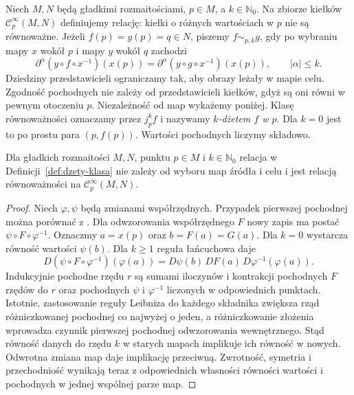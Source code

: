 \begin{definicja}
\label{def:dzety-klasa}
Niech $M,N$ będą gładkimi rozmaitościami, $p\in M$,
a $k\in\mathbb N_0$. Na zbiorze kiełków
$\mathcal C^\infty_p(M,N)$ definiujemy relację:
kiełki o różnych wartościach w $p$ nie są równoważne.
Jeżeli $f(p)=g(p)=q\in N$, piszemy $f\sim_{p,k}g$, gdy
po wybraniu mapy $x$ wokół $p$ i mapy $y$ wokół $q$ zachodzi
\[
 \partial^\alpha (y\circ f\circ x^{-1})(x(p))
 =\partial^\alpha (y\circ g\circ x^{-1})(x(p)),
 \qquad |\alpha|\le k.
\]
Dziedziny przedstawicieli ograniczamy tak, aby obrazy
leżały w mapie celu. Zgodność pochodnych nie zależy
od przedstawicieli kiełków, gdyż są oni równi w pewnym
otoczeniu $p$. Niezależność od map wykażemy poniżej.
Klasę równoważności oznaczamy przez $j_p^k f$ i nazywamy
\emph{$k$-dżetem $f$ w $p$}. Dla $k=0$ jest to po prostu para
$(p,f(p))$. Wartości pochodnych liczymy składowo.
\end{definicja}

\begin{lemat}
\label{lem:dzety-mapy}
Dla gładkich rozmaitości $M,N$, punktu $p\in M$
i $k\in\mathbb N_0$ relacja w Definicji~\ref{def:dzety-klasa}
nie zależy od wyboru map źródła i celu i jest
relacją równoważności na $\mathcal C^\infty_p(M,N)$.
\end{lemat}
\begin{proof}
Niech $\varphi,\psi$ będą zmianami współrzędnych.
Przypadek pierwszej pochodnej można porównać z
.
Dla odwzorowania współrzędnego $F$ nowy zapis ma postać
$\psi\circ F\circ\varphi^{-1}$. Oznaczmy $a=x(p)$ oraz $b=F(a)=G(a)$.
Dla $k=0$ wystarcza równość wartości $\psi(b)$.
Dla $k\ge1$ reguła łańcuchowa daje
\[
 D(\psi\circ F\circ\varphi^{-1})(\varphi(a))
 =D\psi(b)\,DF(a)\,D\varphi^{-1}(\varphi(a)).
\]
Indukcyjnie pochodne rzędu $r$ są sumami iloczynów
i kontrakcji pochodnych $F$ rzędów do $r$ oraz
pochodnych $\psi$ i $\varphi^{-1}$ liczonych
w odpowiednich punktach. Istotnie, zastosowanie
reguły Leibniza do każdego składnika zwiększa
rząd różniczkowanej pochodnej co najwyżej o jeden,
a różniczkowanie złożenia wprowadza czynnik
pierwszej pochodnej odwzorowania wewnętrznego.
Stąd równość danych do rzędu $k$ w starych mapach
implikuje ich równość w nowych. Odwrotna zmiana
map daje implikację przeciwną. Zwrotność, symetria
i przechodniość wynikają teraz z odpowiednich
własności równości wartości i pochodnych
w jednej wspólnej parze map.
\end{proof}

